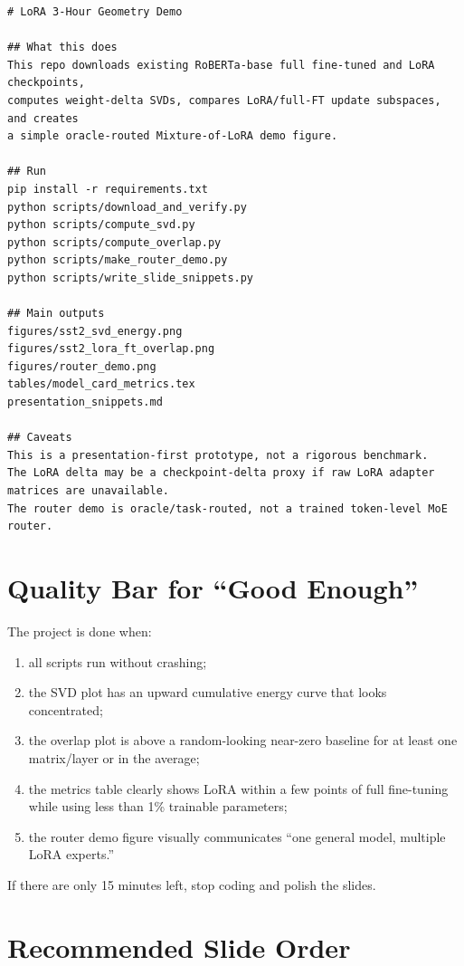 \documentclass[11pt]{article}
\begin{document}
\begin{lstlisting}
# LoRA 3-Hour Geometry Demo

## What this does
This repo downloads existing RoBERTa-base full fine-tuned and LoRA checkpoints,
computes weight-delta SVDs, compares LoRA/full-FT update subspaces, and creates
a simple oracle-routed Mixture-of-LoRA demo figure.

## Run
pip install -r requirements.txt
python scripts/download_and_verify.py
python scripts/compute_svd.py
python scripts/compute_overlap.py
python scripts/make_router_demo.py
python scripts/write_slide_snippets.py

## Main outputs
figures/sst2_svd_energy.png
figures/sst2_lora_ft_overlap.png
figures/router_demo.png
tables/model_card_metrics.tex
presentation_snippets.md

## Caveats
This is a presentation-first prototype, not a rigorous benchmark.
The LoRA delta may be a checkpoint-delta proxy if raw LoRA adapter matrices are unavailable.
The router demo is oracle/task-routed, not a trained token-level MoE router.
\end{lstlisting}

\section{Quality Bar for ``Good Enough''}

The project is done when:

\begin{enumerate}[leftmargin=*]
    \item all scripts run without crashing;
    \item the SVD plot has an upward cumulative energy curve that looks concentrated;
    \item the overlap plot is above a random-looking near-zero baseline for at least one matrix/layer or in the average;
    \item the metrics table clearly shows LoRA within a few points of full fine-tuning while using less than 1\% trainable parameters;
    \item the router demo figure visually communicates ``one general model, multiple LoRA experts.''
\end{enumerate}

If there are only 15 minutes left, stop coding and polish the slides.

\section{Recommended Slide Order}
\end{document}
